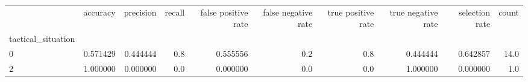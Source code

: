 \begin{tabular}{lrrrrrrrrr}
\toprule
{} &  accuracy &  precision &  recall &  false positive rate &  false negative rate &  true positive rate &  true negative rate &  selection rate &  count \\
tactical\_situation &           &            &         &                      &                      &                     &                     &                 &        \\
\midrule
0                  &  0.571429 &   0.444444 &     0.8 &             0.555556 &                  0.2 &                 0.8 &            0.444444 &        0.642857 &   14.0 \\
2                  &  1.000000 &   0.000000 &     0.0 &             0.000000 &                  0.0 &                 0.0 &            1.000000 &        0.000000 &    1.0 \\
\bottomrule
\end{tabular}

